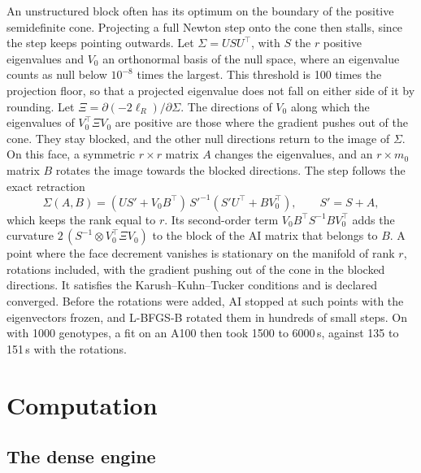 \documentclass[article,nojss]{jss}
\begin{document}
An unstructured block often has its optimum on the boundary of the positive
semidefinite cone. Projecting a full Newton step onto the cone then stalls,
since the step keeps pointing outwards. Let $\Sigma = U S U^\top$, with $S$
the $r$ positive eigenvalues and $V_0$ an orthonormal basis of the null space,
where an eigenvalue counts as null below $10^{-8}$ times the largest. This
threshold is 100 times the projection floor, so that a projected eigenvalue
does not fall on either side of it by rounding. Let $\Xi = \partial(-2\ell_R)/\partial
\Sigma$. The directions of $V_0$ along which the eigenvalues of $V_0^\top
\Xi V_0$ are positive are those where the gradient pushes out of the cone.
They stay blocked, and the other null directions return to the image of
$\Sigma$. On this face, a symmetric $r \times r$ matrix $A$ changes the eigenvalues,
and an $r \times m_0$ matrix $B$ rotates the image towards the blocked
directions. The step follows the exact retraction
\begin{equation}\label{eq:retraction}
  \Sigma(A, B) = (U S' + V_0 B^\top)\, S'^{-1} (S' U^\top + B V_0^\top),
  \qquad S' = S + A,
\end{equation}
which keeps the rank equal to $r$. Its second-order term $V_0 B^\top S^{-1} B
V_0^\top$ adds the curvature $2\,(S^{-1} \otimes
V_0^\top \Xi V_0)$ to the block of the AI matrix that belongs to $B$. A
point where the face decrement vanishes is stationary on the manifold of rank
$r$, rotations included, with the gradient pushing out of the cone in the
blocked directions. It satisfies the Karush--Kuhn--Tucker conditions and is
declared converged. Before the rotations were added, AI stopped at such
points with the eigenvectors frozen, and L-BFGS-B rotated them in hundreds of
small steps. On  with 1000 genotypes, a fit on an A100 then took
1500 to 6000\,s, against 135 to 151\,s with the rotations.

\section{Computation}\label{sec:computation}

\subsection{The dense engine}\label{sec:dense}
\end{document}
